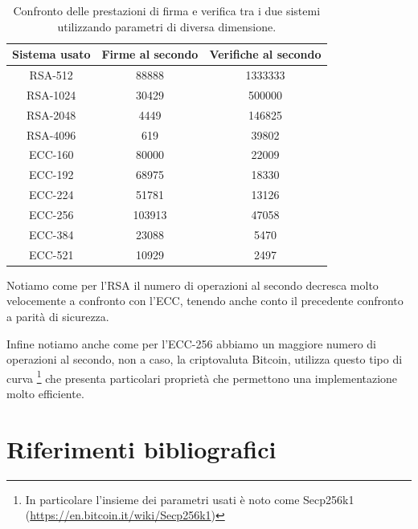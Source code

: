 \documentclass{article}
\begin{document}
	\begin{table}[H]
		\centering
		\begin{tabular}{|c|c|c|}
			\toprule
			Sistema usato & Firme al secondo & Verifiche al secondo \\ \midrule
			RSA-512       & 88888            & 1333333              \\
			RSA-1024      & 30429            & 500000               \\
			RSA-2048      & 4449             & 146825               \\
			RSA-4096      & 619              & 39802                \\ \midrule
			ECC-160       & 80000            & 22009                \\
			ECC-192       & 68975            & 18330                \\
			ECC-224       & 51781            & 13126                \\
			ECC-256       & 103913           & 47058                \\
			ECC-384       & 23088            & 5470                 \\ 
			ECC-521       & 10929            & 2497                 \\ \bottomrule
		\end{tabular}
	\caption{Confronto delle prestazioni di firma e verifica tra i due sistemi utilizzando parametri di diversa dimensione.}
	\end{table}
	
	Notiamo come per l'RSA il numero di operazioni al secondo decresca molto velocemente a confronto 
	con l'ECC, tenendo anche conto il precedente confronto a parità di sicurezza.
	
	Infine notiamo anche come per l'ECC-256 abbiamo un maggiore numero di operazioni al secondo,
	non a caso, la criptovaluta Bitcoin, utilizza questo tipo di curva 
	\footnote{In particolare l'insieme dei parametri usati è noto come Secp256k1 (\url{https://en.bitcoin.it/wiki/Secp256k1})} che presenta 
	particolari proprietà che permettono una implementazione molto efficiente.
	
	\clearpage
	
	\renewcommand*{\refname}{} 
	\section*{Riferimenti bibliografici}	
	
\end{document}
